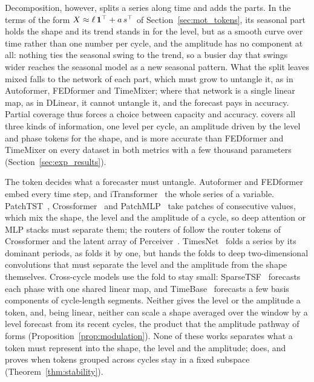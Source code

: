 {
Decomposition, however, splits a series along time and adds the parts. In the terms of the form $X\approx\ell\,\mathbf 1^\top+a\,s^\top$ of Section~\ref{sec:mot_tokens}, its seasonal part holds the shape and its trend stands in for the level, but as a smooth curve over time rather than one number per cycle, and the amplitude has no component at all: nothing ties the seasonal swing to the trend, so a busier day that swings wider reaches the seasonal model as a new seasonal pattern. What the split leaves mixed falls to the network of each part, which must grow to untangle it, as in Autoformer, FEDformer and TimeMixer; where that network is a single linear map, as in DLinear, it cannot untangle it, and the forecast pays in accuracy. Partial coverage thus forces a choice between capacity and accuracy. \sysplus covers all three kinds of information, one level per cycle, an amplitude driven by the level and phase tokens for the shape, and is more accurate than FEDformer and TimeMixer on every dataset in both metrics with a few thousand parameters (Section~\ref{sec:exp_results}).

The token decides what a forecaster must untangle. Autoformer and FEDformer embed every time step, and iTransformer~\citep{liu2023itransformer} the whole series of a variable. PatchTST~\citep{nie2023patchtst}, Crossformer~\citep{zhang2023crossformer} and PatchMLP~\citep{tang2025patchmlp} take patches of consecutive values, which mix the shape, the level and the amplitude of a cycle, so deep attention or MLP stacks must separate them; the routers of \sysplus follow the router tokens of Crossformer and the latent array of Perceiver~\citep{jaegle2021perceiver}. TimesNet~\citep{wu2023timesnet} folds a series by its dominant periods, as \sysplus folds it by one, but hands the folds to deep two-dimensional convolutions that must separate the level and the amplitude from the shape themselves. Cross-cycle models use the fold to stay small: SparseTSF~\citep{lin2024sparsetsf} forecasts each phase with one shared linear map, and TimeBase~\citep{huang2025timebase} forecasts a few basis components of cycle-length segments. Neither gives the level or the amplitude a token, and, being linear, neither can scale a shape averaged over the window by a level forecast from its recent cycles, the product that the amplitude pathway of \sysplus forms (Proposition~\ref{prop:modulation}). None of these works separates what a token must represent into the shape, the level and the amplitude; \sysplus does, and proves when tokens grouped across cycles stay in a fixed subspace (Theorem~\ref{thm:stability}).

}
